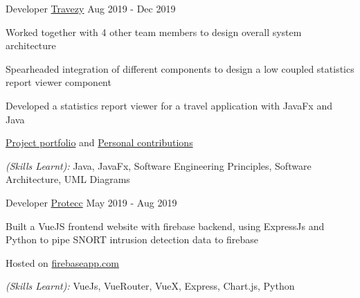\begin{cventries}
  \cventry
    {Developer} %
    {\href{https://github.com/bjhoohaha/main}{Travezy}} %
    {} %
    {Aug 2019 - Dec 2019} %
    {
      \begin{cvitems} %
        \item {Worked together with 4 other team members to design overall system architecture}
        \item {Spearheaded integration of different components to design a low coupled statistics report viewer component}
        \item {Developed a statistics report viewer for a travel application with JavaFx and Java}
        \item {\textcolor{eduDft-darkblue}{\href{https://ay1920s1-cs2103t-t17-2.github.io/main/index.html}{Project portfolio}} and  \textcolor{eduDft-darkblue}{\href{https://ay1920s1-cs2103t-t17-2.github.io/main/team/bjhoohaha.html}{Personal contributions}}}
        \item {\textit{(Skills Learnt):} Java, JavaFx, Software Engineering Principles, Software Architecture, UML Diagrams}
      \end{cvitems}
    }

  \cventry
    {Developer} %
    {\href{https://github.com/bjhoohaha/Protecc}{Protecc}} %
    {} %
    {May 2019 - Aug 2019} %
    {
      \begin{cvitems} %
        \item {Built a VueJS frontend website with firebase backend, using ExpressJs and Python to pipe SNORT intrusion detection data to firebase}
        \item {Hosted on {\textcolor{eduDft-darkblue}{\href{https://employee-
        manager-66213.firebaseapp.com}{firebaseapp.com}}}}
        \item {\textit{(Skills Learnt):} VueJs, VueRouter, VueX, Express, Chart.js, Python}
      \end{cvitems}
    }


\end{cventries}

